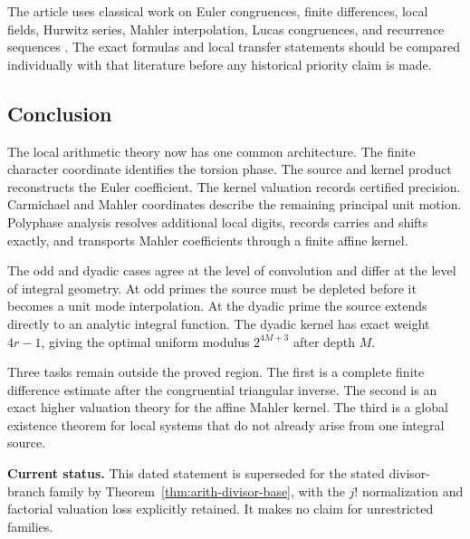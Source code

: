 The article uses classical work on Euler congruences, finite differences, local fields, Hurwitz series, Mahler interpolation, Lucas congruences, and recurrence sequences \cite{CarlitzLevine1960,Young1999,Young2001,Sun2008,Chen2004,Lucas1878a,LidlNiederreiter1997,EverestVanDerPoortenShparlinskiWard2003}. The exact formulas and local transfer statements should be compared individually with that literature before any historical priority claim is made.

\subsection{Conclusion}\label{hist:sec:conclusion}

The local arithmetic theory now has one common architecture. The finite character coordinate identifies the torsion phase. The source and kernel product reconstructs the Euler coefficient. The kernel valuation records certified precision. Carmichael and Mahler coordinates describe the remaining principal unit motion. Polyphase analysis resolves additional local digits, records carries and shifts exactly, and transports Mahler coefficients through a finite affine kernel.

The odd and dyadic cases agree at the level of convolution and differ at the level of integral geometry. At odd primes the source must be depleted before it becomes a unit mode interpolation. At the dyadic prime the source extends directly to an analytic integral function. The dyadic kernel has exact weight \(4r-1\), giving the optimal uniform modulus \(2^{4M+3}\) after depth \(M\).

Three tasks remain outside the proved region. The first is a complete finite difference estimate after the congruential triangular inverse. The second is an exact higher valuation theory for the affine Mahler kernel. The third is a global existence theorem for local systems that do not already arise from one integral source.

\par\smallskip\noindent\textbf{Current status.} This dated statement is superseded for the stated divisor-branch family by Theorem~\ref{thm:arith-divisor-base}, with the $j!$ normalization and factorial valuation loss explicitly retained. It makes no claim for unrestricted families.\par


